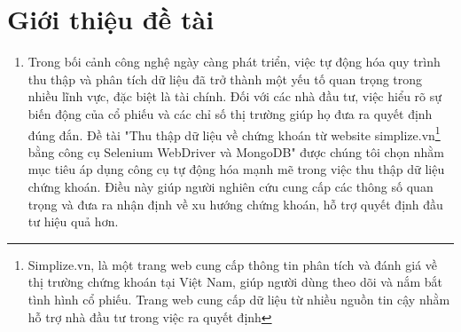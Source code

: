 \section{Giới thiệu đề tài}
\begin{enumerate}
	\item [] 
        \hspace*{0.7cm}Trong bối cảnh công nghệ ngày càng phát triển, việc tự động hóa quy trình thu thập và phân tích dữ liệu đã trở thành một yếu tố quan trọng trong nhiều lĩnh vực, đặc biệt là tài chính. Đối với các nhà đầu tư, việc hiểu rõ sự biến động của cổ phiếu và các chỉ số thị trường giúp họ đưa ra quyết định đúng đắn. Đề tài "Thu thập dữ liệu về chứng khoán từ website simplize.vn\footnote{Simplize.vn, là một trang web cung cấp thông tin phân tích và đánh giá về thị trường chứng khoán tại Việt Nam, giúp người dùng theo dõi và nắm bắt tình hình cổ phiếu. Trang web cung cấp dữ liệu từ nhiều nguồn tin cậy nhằm hỗ trợ nhà đầu tư trong việc ra quyết định} bằng công cụ Selenium WebDriver và MongoDB" được chúng tôi chọn nhằm mục tiêu áp dụng công cụ tự động hóa mạnh mẽ trong việc thu thập dữ liệu chứng khoán. Điều này giúp người nghiên cứu cung cấp các thông số quan trọng và đưa ra nhận định về xu hướng chứng khoán, hỗ trợ quyết định đầu tư hiệu quả hơn.
    
\end{enumerate}